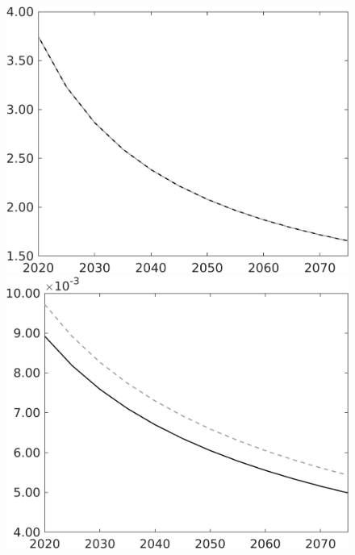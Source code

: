 \documentclass[12pt]{article}
\begin{document}
\begin{figure}[h!!]
\begin{minipage}[]{0.32\textwidth}
\end{minipage}	
\begin{minipage}[]{0.32\textwidth}
\includegraphics[width=1\textwidth]{../../codding_model/own_basedOnFried/optimalPol_010922_revision/figures/all_13Sept22/CompTaul_Equlab_LFBAU_Reg0_pgpftf_spillover0_nsk1_xgr1_knspil0_sep1_countec0_GovRev0_etaa0.79_lgd0.png}
\end{minipage}		
\begin{minipage}[]{0.32\textwidth}
	\includegraphics[width=1\textwidth]{../../codding_model/own_basedOnFried/optimalPol_010922_revision/figures/all_13Sept22/CompTaul_Equlab_LFBAU_Reg0_Lf_spillover0_nsk1_xgr1_knspil0_sep1_countec0_GovRev0_etaa0.79_lgd0.png}

\end{minipage}
\end{figure}
\end{document}
